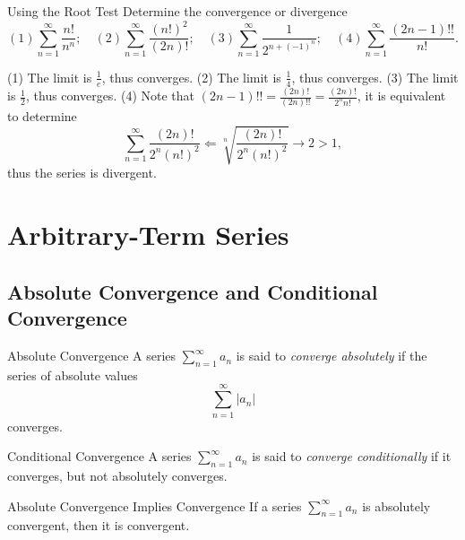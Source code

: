 \begin{example}{Using the Root Test}{}
  Determine the convergence or divergence
  \begin{equation}
    (1) \sum\limits_{n = 1}^{\infty} \frac{n!}{n^n}; \quad
    (2) \sum\limits_{n = 1}^{\infty} \frac{(n!)^2}{(2n)!}; \quad
    (3) \sum\limits_{n = 1}^{\infty} \frac{1}{2^{n + (-1)^n}}; \quad
    (4) \sum\limits_{n = 1}^{\infty} \frac{(2n-1)!!}{n!}.
  \end{equation}
\end{example}

\begin{solution}
  (1) The limit is $\frac{1}{e}$, thus converges.
  (2) The limit is $\frac{1}{4}$, thus converges.
  (3) The limit is $\frac{1}{2}$, thus converges.
  (4) Note that $(2n-1)!! = \frac{(2n)!}{(2n)!!} = \frac{(2n)!}{2^nn!}$,
  it is equivalent to determine
  \begin{equation}
    \sum\limits_{n = 1}^{\infty} \frac{(2n)!}{2^n(n!)^2}
    \Leftarrow
    \sqrt[n]{\frac{(2n)!}{2^n(n!)^2}} \rightarrow 2 > 1,
  \end{equation}
  thus the series is divergent.
\end{solution}

\section{Arbitrary-Term Series}

\subsection{Absolute Convergence and Conditional Convergence}

\begin{definition}{Absolute Convergence}{}
  A series $\sum\limits_{n = 1}^{\infty}a_n$ is said to \emph{converge absolutely}
  if the series of absolute values
  \begin{equation}
    \sum\limits_{n = 1}^{\infty} |a_n|
  \end{equation}
  converges.
\end{definition}

\begin{definition}{Conditional Convergence}{}
  A series $\sum\limits_{n = 1}^{\infty}a_n$ is said to \emph{converge conditionally}
  if it converges, but not absolutely converges.
\end{definition}

\begin{proposition}{Absolute Convergence Implies Convergence}{}
  If a series $\sum\limits_{n = 1}^{\infty} a_n$ is absolutely convergent,
  then it is convergent.
\end{proposition}

